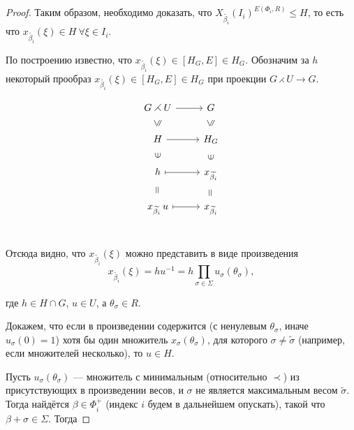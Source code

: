 \documentclass[10pt]{article}
\theoremstyle{remark}
\renewcommand{\le}{\leqslant}
\begin{document}
\begin{proof}
Таким образом, необходимо доказать, что $X_{\widetilde{\beta_i}}(I_i)^{E(\Phi_i,R)} \le H$, то есть что
$x_{\widetilde{\beta_i}}(\xi) \in H \ \forall \xi \in I_i$.

По построению известно, что $x_{\widetilde{\beta_i}}(\xi) \in [H_G,E] \in H_G$.
Обозначим за $h$ некоторый прообраз $x_{\widetilde{\beta_i}}(\xi) \in [H_G,E] \in H_G$ при проекции $G \rightthreetimes U \rightarrow G$.

\begin{equation*}
\tikzset{
  Subgroup/.style={
    draw=none,
    every to/.append style={
      edge node={node [sloped, allow upside down, auto=false]{$\le$}}}},
  Equals/.style={
    draw=none,
    every to/.append style={
      edge node={node [sloped, allow upside down, auto=false]{$=$}}}},
  Included/.style={
    draw=none,
    every to/.append style={
      edge node={node [sloped, allow upside down, auto=false]{$\in$}}}}
}
\begin{tikzcd}
G \rightthreetimes U \arrow{r}{} & G \\
H \arrow[Subgroup]{u} \arrow{r}{} & H_G \arrow[Subgroup]{u} \\
h \arrow[Included]{u} \arrow[maps to]{r}{} & x_{\widetilde{\beta_i}} \arrow[Included]{u} \\
x_{\widetilde{\beta_i}}\,u \arrow[Equals]{u} \arrow[maps to]{r}{} & x_{\widetilde{\beta_i}} \arrow[Equals]{u} \\
\end{tikzcd}
\end{equation*}

Отсюда видно, что $x_{\widetilde{\beta_i}}(\xi)$ можно представить в виде произведения $$x_{\widetilde{\beta_i}}(\xi) = h u^{-1} = h \prod_{\sigma \in \Sigma} u_\sigma(\theta_\sigma),$$

где $h\in H\cap G$, $u \in U$, а $\theta_\sigma \in R$.

Докажем, что если в произведении содержится (с ненулевым $\theta_\sigma$, иначе $u_\sigma(0)=1$) хотя бы один множитель $x_\sigma(\theta_\sigma)$, для которого $\sigma \ne \widetilde\sigma$ (например, если множителей несколько), то $u \in H$.%


Пусть $u_\sigma(\theta_\sigma)$ --- множитель с минимальным (относительно $\prec$) из присутствующих в произведении весов, и $\sigma$ не является максимальным весом $\widetilde{\sigma}$. Тогда найдётся $\beta \in \Phi_i^+$ (индекс $i$ будем в дальнейшем опускать), такой что $\beta+\sigma \in \Sigma$. Тогда


\end{proof}
\end{document}
